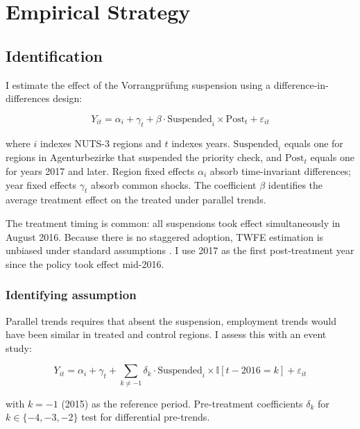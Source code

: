 \documentclass[12pt]{article}
\newcommand{\ind}{\mathbb{I}}
\begin{document}



\section{Empirical Strategy}

\subsection{Identification}

I estimate the effect of the Vorrangpr\"ufung suspension using a difference-in-differences design:

\begin{equation}
Y_{it} = \alpha_i + \gamma_t + \beta \cdot \text{Suspended}_i \times \text{Post}_t + \varepsilon_{it}
\label{eq:did}
\end{equation}

\noindent where $i$ indexes NUTS-3 regions and $t$ indexes years. $\text{Suspended}_i$ equals one for regions in Agenturbezirke that suspended the priority check, and $\text{Post}_t$ equals one for years 2017 and later. Region fixed effects $\alpha_i$ absorb time-invariant differences; year fixed effects $\gamma_t$ absorb common shocks. The coefficient $\beta$ identifies the average treatment effect on the treated under parallel trends.

The treatment timing is common: all suspensions took effect simultaneously in August 2016. Because there is no staggered adoption, TWFE estimation is unbiased under standard assumptions \citep{goodmanbacon2021, deChaisemartin2020, callawaysantanna2021}. I use 2017 as the first post-treatment year since the policy took effect mid-2016.

\subsubsection*{Identifying assumption} Parallel trends requires that absent the suspension, employment trends would have been similar in treated and control regions. I assess this with an event study:

\begin{equation}
Y_{it} = \alpha_i + \gamma_t + \sum_{k \neq -1} \delta_k \cdot \text{Suspended}_i \times \ind[t - 2016 = k] + \varepsilon_{it}
\end{equation}

\noindent with $k = -1$ (2015) as the reference period. Pre-treatment coefficients $\delta_k$ for $k \in \{-4, -3, -2\}$ test for differential pre-trends.
\end{document}
